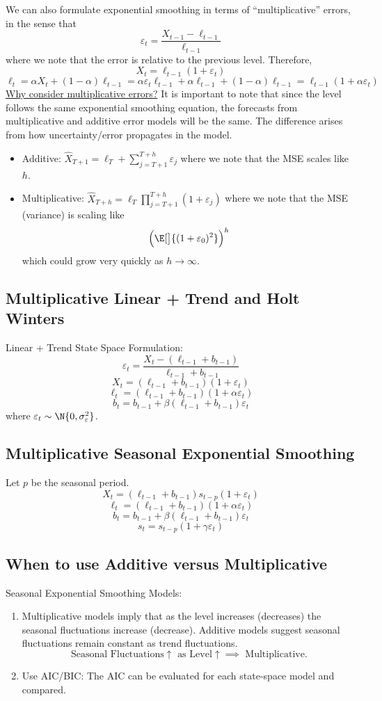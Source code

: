We can also formulate exponential smoothing in terms of ``multiplicative''
errors, in the sense that
\[ \varepsilon_t=\frac{X_{t-1}-\ell_{t-1}}{\ell_{t-1}}  \]
where we note that the error is relative to the previous level. Therefore,
\[ X_t=\ell_{t-1}(1+\varepsilon_t) \]
\[ \ell_t=\alpha X_t+(1-\alpha)\ell_{t-1} =\alpha\varepsilon_t\ell_{t-1}+\alpha\ell_{t-1}+(1-\alpha)\ell_{t-1}
    =\ell_{t-1}(1+\alpha\varepsilon_t) \]
\underline{Why consider multiplicative errors?} It is important
to note that since the level follows the same exponential smoothing equation,
the forecasts from multiplicative and additive error models will be the same.
The difference arises from how uncertainty/error propagates in the model.
\begin{itemize}
    \item Additive: $ \hat{X}_{T+1}=\ell_T+\sum_{j=T+1}^{T+h} \varepsilon_j $
          where we note that the MSE scales like $ h $.
    \item Multiplicative: $ \hat{X}_{T+h}=\ell_T \prod_{j=T+1}^{T+h}(1+\varepsilon_j) $
          where we note that the MSE (variance) is scaling like
          \[ \Bigl(\E[\big]{(1+\varepsilon_0)^2}\Bigr)^h \]
          which could grow very quickly as $ h\to\infty $.
\end{itemize}
\subsection*{Multiplicative Linear + Trend and Holt Winters}
Linear + Trend State Space Formulation:
\[ \varepsilon_t=\frac{X_t-(\ell_{t-1}+b_{t-1})}{\ell_{t-1}+b_{t-1}}  \]
\[ X_t=(\ell_{t-1}+b_{t-1})(1+\varepsilon_t) \]
\[ \ell_t=(\ell_{t-1}+b_{t-1})(1+\alpha\varepsilon_t) \]
\[ b_t=b_{t-1}+\beta(\ell_{t-1}+b_{t-1})\varepsilon_t \]
where $ \varepsilon_t \sim \N{0,\sigma_{\varepsilon}^2} $.
\subsection*{Multiplicative Seasonal Exponential Smoothing}
Let $ p $ be the seasonal period.
\[ X_t=(\ell_{t-1}+b_{t-1})s_{t-p}(1+\varepsilon_t) \]
\[ \ell_t=(\ell_{t-1}+b_{t-1})(1+\alpha\varepsilon_t) \]
\[ b_t=b_{t-1}+\beta(\ell_{t-1}+b_{t-1})\varepsilon_t \]
\[ s_t=s_{t-p}(1+\gamma\varepsilon_t) \]
\subsection*{When to use Additive versus Multiplicative}
Seasonal Exponential Smoothing Models:
\begin{enumerate}[(1)]
    \item Multiplicative models imply that as the level increases (decreases)
          the seasonal fluctuations increase (decrease). Additive models suggest
          seasonal fluctuations remain constant as trend fluctuations.
          \[ \text{Seasonal Fluctuations}\uparrow\text{ as }\text{Level}\uparrow\implies
              \text{ Multiplicative}. \]
    \item Use AIC/BIC\@: The AIC can be evaluated for each state-space
          model and compared.
\end{enumerate}
